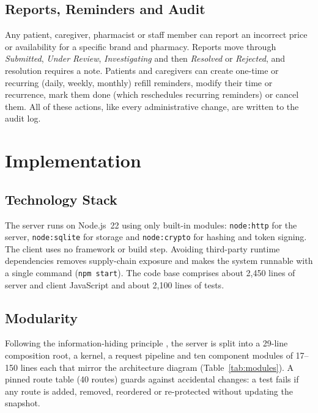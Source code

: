 \documentclass[11pt,a4paper]{article}
\begin{document}
\subsection{Reports, Reminders and Audit}
Any patient, caregiver, pharmacist or staff member can report an incorrect price or availability for a specific brand and pharmacy. Reports move through \emph{Submitted}, \emph{Under Review}, \emph{Investigating} and then \emph{Resolved} or \emph{Rejected}, and resolution requires a note. Patients and caregivers can create one-time or recurring (daily, weekly, monthly) refill reminders, modify their time or recurrence, mark them done (which reschedules recurring reminders) or cancel them. All of these actions, like every administrative change, are written to the audit log.

\section{Implementation}\label{ch:impl}

\subsection{Technology Stack}
The server runs on Node.js~22 \cite{nodejs} using only built-in modules: \texttt{node:http} for the server, \texttt{node:sqlite} for storage and \texttt{node:crypto} for hashing and token signing. The client uses no framework or build step. Avoiding third-party runtime dependencies removes supply-chain exposure and makes the system runnable with a single command (\texttt{npm start}). The code base comprises about 2{,}450 lines of server and client JavaScript and about 2{,}100 lines of tests.

\subsection{Modularity}
Following the information-hiding principle \cite{parnas1972}, the server is split into a 29-line composition root, a kernel, a request pipeline and ten component modules of 17--150 lines each that mirror the architecture diagram (Table~\ref{tab:modules}). A pinned route table (40 routes) guards against accidental changes: a test fails if any route is added, removed, reordered or re-protected without updating the snapshot.
\end{document}
